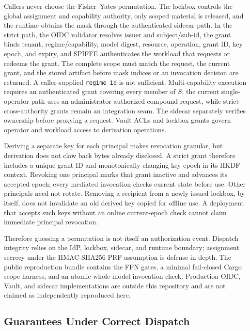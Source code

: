 \documentclass[11pt,a4paper]{article}
\begin{document}
Callers never choose the Fisher--Yates permutation.  The lockbox
controls the global assignment and capability authority, only scoped
material is released, and the runtime obtains the mask through the
authenticated sidecar path.  In the strict path, the OIDC validator
resolves issuer and subject/sub-id, the grant binds tenant,
regime/capability, model digest, resource, operation, grant ID, key
epoch, and expiry, and SPIFFE authenticates the
workload that requests or redeems the grant.  The complete scope must
match the request, the current grant, and the stored artifact before
mask indices or an invocation decision are returned.  A
caller-supplied \texttt{regime\_id} is not sufficient.
Multi-capability execution requires an authenticated grant
covering every member of $S$; the current single-operator path uses
an administrator-authorized compound request, while strict
cross-authority grants remain an integration seam.  The sidecar
separately verifies ownership before proxying a request.  Vault ACLs and lockbox
grants govern operator and workload access to derivation operations.

Deriving a separate key for each principal makes revocation granular,
but derivation does not claw back bytes already disclosed.  A strict
grant therefore includes a unique grant ID and monotonically changing
key epoch in its HKDF context.  Revoking one principal marks that grant
inactive and advances its accepted epoch; every mediated invocation
checks current state before use.  Other principals need not rotate.
Removing a recipient from a newly issued lockbox, by itself, does not
invalidate an old derived key copied for offline use.  A deployment
that accepts such keys without an online current-epoch check cannot
claim immediate principal revocation.

Therefore guessing a permutation is not itself an authorization
event.  Dispatch integrity relies on the IdP,
lockbox, sidecar, and runtime boundary; assignment secrecy under the
HMAC-SHA256 PRF assumption is defense in depth.  The public
reproduction bundle contains the FFN gates, a minimal fail-closed Cargo
scope harness, and an atomic whole-model invocation check.  Production
OIDC, Vault, and sidecar
implementations are outside this repository and are not claimed as
independently reproduced here.

\subsection{Guarantees Under Correct Dispatch}
\end{document}
